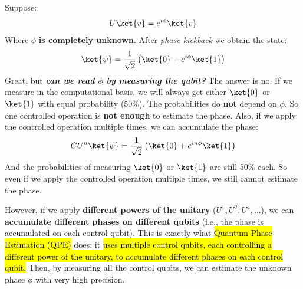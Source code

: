 \highspace
Suppose:
\begin{equation*}
    U\ket{v} = e^{i \phi} \ket{v}
\end{equation*}
Where $\phi$ \textbf{is completely unknown}. After \emph{phase kickback} we obtain the state:
\begin{equation*}
    \ket{\psi} = \frac{1}{\sqrt{2}} \left(\ket{0} + e^{i \phi} \ket{1}\right)
\end{equation*}
Great, but \emph{\textbf{can we read $\phi$ by measuring the qubit?}} The answer is no. If we measure in the computational basis, we will always get either $\ket{0}$ or $\ket{1}$ with equal probability (50\%). The probabilities do \textbf{not} depend on $\phi$. So one controlled operation is \textbf{not enough} to estimate the phase. Also, if we apply the controlled operation multiple times, we can accumulate the phase:
\begin{equation*}
    CU^{n}\ket{\psi} = \frac{1}{\sqrt{2}} \left(\ket{0} + e^{i n \phi} \ket{1}\right)
\end{equation*}
And the probabilities of measuring $\ket{0}$ or $\ket{1}$ are still 50\% each. So even if we apply the controlled operation multiple times, we still cannot estimate the phase.

\highspace
However, if we apply \textbf{different powers of the unitary} ($U^1, U^2, U^4, \dots$), we can \textbf{accumulate different phases on different qubits} (i.e., the phase is accumulated on each control qubit). This is exactly what \hl{Quantum Phase Estimation (QPE)} does: it \hl{uses multiple control qubits, each controlling a different power of the unitary, to accumulate different phases on each control qubit.} Then, by measuring all the control qubits, we can estimate the unknown phase $\phi$ with very high precision.